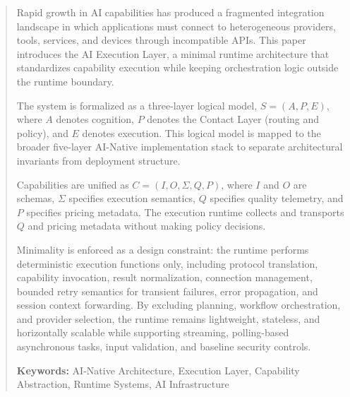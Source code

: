 \begin{abstract}

Rapid growth in AI capabilities has produced a fragmented integration landscape in which applications must connect to heterogeneous providers, tools, services, and devices through incompatible APIs. This paper introduces the AI Execution Layer, a minimal runtime architecture that standardizes capability execution while keeping orchestration logic outside the runtime boundary.

The system is formalized as a three-layer logical model, $S = (A, P, E)$, where $A$ denotes cognition, $P$ denotes the Contact Layer (routing and policy), and $E$ denotes execution. This logical model is mapped to the broader five-layer AI-Native implementation stack to separate architectural invariants from deployment structure.

Capabilities are unified as $C = (I, O, \Sigma, Q, P)$, where $I$ and $O$ are schemas, $\Sigma$ specifies execution semantics, $Q$ specifies quality telemetry, and $P$ specifies pricing metadata. The execution runtime collects and transports $Q$ and pricing metadata without making policy decisions.

Minimality is enforced as a design constraint: the runtime performs deterministic execution functions only, including protocol translation, capability invocation, result normalization, connection management, bounded retry semantics for transient failures, error propagation, and session context forwarding. By excluding planning, workflow orchestration, and provider selection, the runtime remains lightweight, stateless, and horizontally scalable while supporting streaming, polling-based asynchronous tasks, input validation, and baseline security controls.

\vspace{0.5em}
\noindent\textbf{Keywords:} AI-Native Architecture, Execution Layer, Capability Abstraction, Runtime Systems, AI Infrastructure

\end{abstract}
